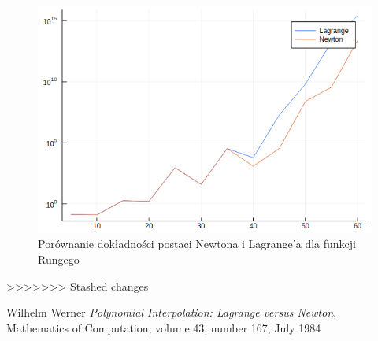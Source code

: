 \documentclass[paper=a4, fontsize=11pt]{scrartcl} %
\numberwithin{equation}{section} %
\numberwithin{figure}{section} %
\numberwithin{table}{section} %
\begin{document}
\begin{figure}[h!]
  \includegraphics[width=\linewidth]{lagnew.png}
  \caption{Porównanie dokładności postaci Newtona i Lagrange'a dla funkcji Rungego}
  \label{lagnew}
\end{figure} 
>>>>>>> Stashed changes


\begin{thebibliography}{9}

  Wilhelm Werner
  \textit{Polynomial Interpolation: Lagrange versus Newton}, \\
  Mathematics of Computation, volume 43, number 167, July 1984
\end{thebibliography}
\end{document}

